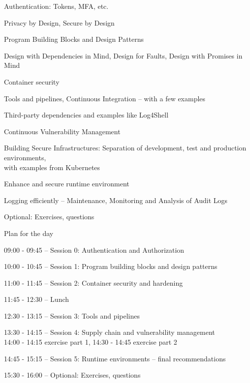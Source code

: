 \documentclass[Screen16to9,17pt]{foils}
\begin{document}
\begin{list2}
\item Authentication: Tokens, MFA, etc.
\item Privacy by Design, Secure by Design
\item Program Building Blocks and Design Patterns
\item Design with Dependencies in Mind, Design for Faults, Design with Promises in Mind
\item Container security
\item Tools and pipelines, Continuous Integration -- with a few examples
\item Third-party dependencies and examples like Log4Shell
\item Continuous Vulnerability Management
\item Building Secure Infrastructures: Separation of development, test and production environments,\\ with examples from Kubernetes
\item Enhance and secure runtime environment
\item Logging efficiently -- Maintenance, Monitoring and Analysis of Audit Logs
\item Optional: Exercises, questions
\end{list2}



Plan for the day
\begin{list1}
\item 09:00 - 09:45 -- Session 0: Authentication and Authorization
\item 10:00 - 10:45 -- Session 1: Program building blocks and design patterns
\item 11:00 - 11:45 -- Session 2: Container security and hardening
\item 11:45 - 12:30 -- Lunch
\item 12:30 - 13:15 -- Session 3: Tools and pipelines
\item 13:30 - 14:15 -- Session 4: Supply chain and vulnerability management\\
14:00 - 14:15 exercise part 1, 14:30 - 14:45 exercise part 2
\item 14:45 - 15:15 -- Session 5: Runtime environments -- final recommendations
\item 15:30 - 16:00 -- Optional: Exercises, questions
\end{list1}


\end{document}
